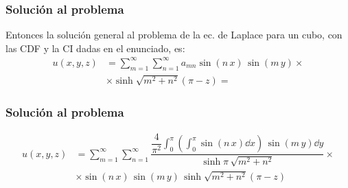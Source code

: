 \begin{frame}
\frametitle{Solución al problema}
Entonces la solución general al problema de la ec. de Laplace para un cubo, con las CDF y la CI dadas en el enunciado, es:
\pause
\begin{align*}
u(x, y, z) &= \displaystyle \sum_{m=1}^{\infty} \sum_{n=1}^{\infty} a_{mn} \sin (n \, x) \, \sin (m \, y) \times \\[0.5em]
&\times \sinh \sqrt{m^{2} + n^{2}}(\pi - z) =
\end{align*}
\end{frame}
\begin{frame}
\frametitle{Solución al problema}
\fontsize{12}{12}\selectfont
\begin{align*}
u(x, y, z)  &= \sum_{m=1}^{\infty} \sum_{n=1}^{\infty} \dfrac{\displaystyle \dfrac{4}{\pi^{2}} \int_{0}^{\pi} \left( \int_{0}^{\pi} \sin (n \, x) \dd{x} \right) \, \sin (m \, y) \dd{y}}{\sinh \pi \, \sqrt{m^{2} + n^{2}}} \times \\[0.5em]
&\times \sin (n \, x) \, \sin (m \, y) \, \sinh \sqrt{m^{2} + n^{2}}(\pi - z)
\end{align*}
\end{frame}
